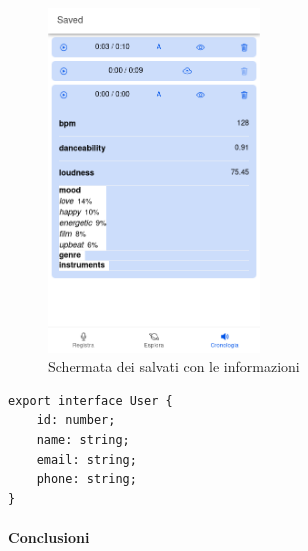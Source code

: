 \documentclass[a4paper]{article}
\begin{document}
\begin{figure}[h]
	\centering
	\includegraphics[width=0.5\textwidth]{./saved-infos.png}
	\caption{Schermata dei salvati con le informazioni}
\end{figure}



\begin{verbatim}
export interface User {
	id: number;
	name: string;
	email: string;
	phone: string;
}
\end{verbatim}

\paragraph{Conclusioni}
\end{document}
